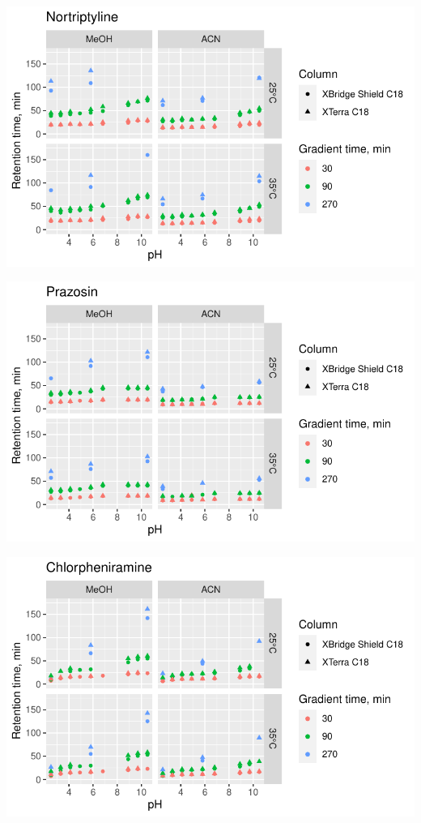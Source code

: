 \documentclass[
  letterpaper,
  DIV=11,
  numbers=noendperiod]{scrreprt}
\begin{document}
\includegraphics{index_files/figure-pdf/unnamed-chunk-4-27.pdf}

\includegraphics{index_files/figure-pdf/unnamed-chunk-4-28.pdf}

\includegraphics{index_files/figure-pdf/unnamed-chunk-4-29.pdf}
\end{document}
